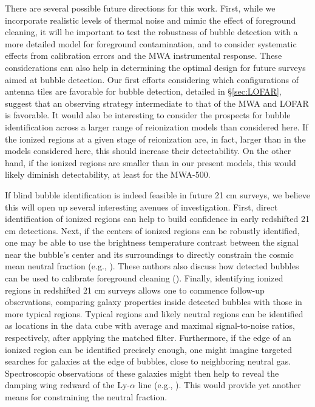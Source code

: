 There are several possible future directions for this work. First, while we incorporate realistic levels
of thermal noise and mimic the effect of foreground cleaning, it will be important to
test the robustness of bubble detection with a more detailed model for foreground contamination,
and to consider systematic effects from calibration errors and the MWA instrumental response.
These considerations can also help in determining the optimal design for future surveys aimed at
bubble detection. Our first efforts considering which configurations of antenna tiles are favorable for bubble
detection, detailed in \S \ref{sec:LOFAR}, suggest that an observing strategy
intermediate to that of the MWA and LOFAR is favorable. It would also be interesting to
consider the prospects for bubble identification across a larger range of reionization models
than considered here. If the ionized regions at a given stage of reionization are, in fact, larger 
than in the models considered here, this should increase their detectability. On the
other hand, if the ionized regions are smaller than in our present models, this would likely
diminish detectability, at least for the MWA-500.

If blind bubble identification is indeed feasible in future 21 cm surveys, we believe
this will open up several interesting avenues of investigation. First, direct identification
of ionized regions can help to build confidence in early redshifted 21 cm detections.
Next, if the centers of ionized regions can be robustly identified, one may be able
to use the brightness temperature contrast between the signal near the bubble's center and its surroundings
to directly constrain the cosmic mean neutral fraction (e.g., \citealt{Petrovic:2010me}).
These authors also discuss how detected bubbles can be used to calibrate foreground
cleaning (\citealt{Petrovic:2010me}). Finally, identifying ionized regions in
redshifted 21 cm surveys allows one to commence follow-up observations, comparing galaxy properties inside detected bubbles
with those in more typical regions. Typical regions and likely neutral
regions can be identified as locations in the data cube with average and maximal signal-to-noise ratios, respectively, after
applying the matched filter.
Furthermore, if the edge of an ionized region can be identified
precisely enough, one might imagine targeted searches for galaxies at the edge of bubbles, close to neighboring neutral gas.
Spectroscopic
observations of these galaxies might then help to reveal 
the damping wing redward of the Ly-$\alpha$ line (e.g., \citealt{MiraldaEscude:1997qb}).
This would provide yet another means for
constraining the neutral fraction.
















